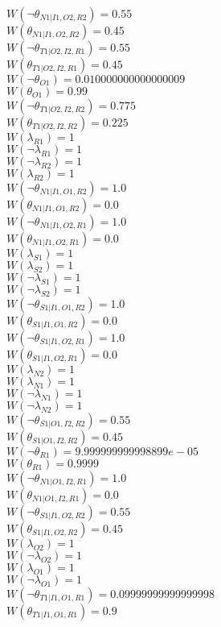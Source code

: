 $W(\neg\theta_{N1|I1,O2,R2})=0.55$\\
$W(\theta_{N1|I1,O2,R2})=0.45$\\
$W(\neg\theta_{T1|O2,I2,R1})=0.55$\\
$W(\theta_{T1|O2,I2,R1})=0.45$\\
$W(\neg\theta_{O1})=0.010000000000000009$\\
$W(\theta_{O1})=0.99$\\
$W(\neg\theta_{T1|O2,I2,R2})=0.775$\\
$W(\theta_{T1|O2,I2,R2})=0.225$\\
$W(\lambda_{R1})=1$\\
$W(\neg\lambda_{R1})=1$\\
$W(\neg\lambda_{R2})=1$\\
$W(\lambda_{R2})=1$\\
$W(\neg\theta_{N1|I1,O1,R2})=1.0$\\
$W(\theta_{N1|I1,O1,R2})=0.0$\\
$W(\neg\theta_{N1|I1,O2,R1})=1.0$\\
$W(\theta_{N1|I1,O2,R1})=0.0$\\
$W(\lambda_{S1})=1$\\
$W(\lambda_{S2})=1$\\
$W(\neg\lambda_{S1})=1$\\
$W(\neg\lambda_{S2})=1$\\
$W(\neg\theta_{S1|I1,O1,R2})=1.0$\\
$W(\theta_{S1|I1,O1,R2})=0.0$\\
$W(\neg\theta_{S1|I1,O2,R1})=1.0$\\
$W(\theta_{S1|I1,O2,R1})=0.0$\\
$W(\lambda_{N2})=1$\\
$W(\lambda_{N1})=1$\\
$W(\neg\lambda_{N1})=1$\\
$W(\neg\lambda_{N2})=1$\\
$W(\neg\theta_{S1|O1,I2,R2})=0.55$\\
$W(\theta_{S1|O1,I2,R2})=0.45$\\
$W(\neg\theta_{R1})=9.999999999998899e-05$\\
$W(\theta_{R1})=0.9999$\\
$W(\neg\theta_{N1|O1,I2,R1})=1.0$\\
$W(\theta_{N1|O1,I2,R1})=0.0$\\
$W(\neg\theta_{S1|I1,O2,R2})=0.55$\\
$W(\theta_{S1|I1,O2,R2})=0.45$\\
$W(\lambda_{O2})=1$\\
$W(\neg\lambda_{O2})=1$\\
$W(\lambda_{O1})=1$\\
$W(\neg\lambda_{O1})=1$\\
$W(\neg\theta_{T1|I1,O1,R1})=0.09999999999999998$\\
$W(\theta_{T1|I1,O1,R1})=0.9$\\
